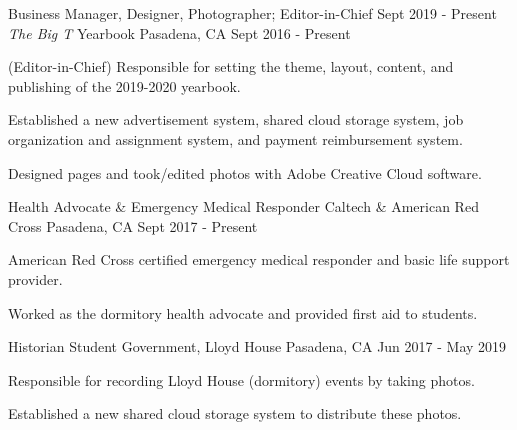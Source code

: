 

\begin{cventries}

  \cventry
    {Business Manager, Designer, Photographer; Editor-in-Chief Sept 2019 - Present}
    {\textit{The Big T} Yearbook}
    {Pasadena, CA} %
    {Sept 2016 - Present} %
    {
      \begin{cvitems}
        \item {(Editor-in-Chief) Responsible for setting the theme, layout, content, and publishing of the 2019-2020 yearbook.}
        \item {Established a new advertisement system, shared cloud storage system, job organization and assignment system, and payment reimbursement system.}
        \item {Designed pages and took/edited photos with Adobe Creative Cloud software.}
      \end{cvitems}
    }

  \cventry
    {Health Advocate \& Emergency Medical Responder} %
    {Caltech \& American Red Cross} %
    {Pasadena, CA} %
    {Sept 2017 - Present} %
    {
      \begin{cvitems} %
        \item {American Red Cross certified emergency medical responder and basic life support provider.}
        \item {Worked as the dormitory health advocate and provided first aid to students.}
      \end{cvitems}
    }

  \cventry
    {Historian} %
    {Student Government, Lloyd House} %
    {Pasadena, CA} %
    {Jun 2017 - May 2019} %
    {
      \begin{cvitems} %
        \item {Responsible for recording Lloyd House (dormitory) events by taking photos.}
        \item {Established a new shared cloud storage system to distribute these photos.}
      \end{cvitems}
    }

\end{cventries}
